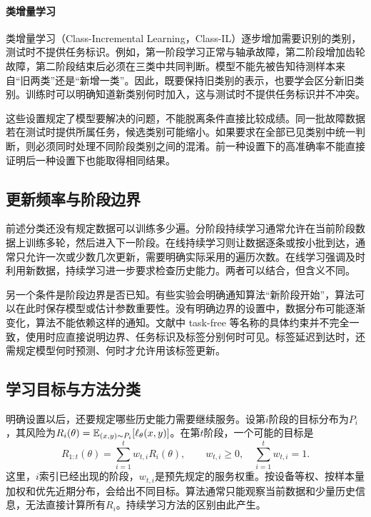 \paragraph{类增量学习}
类增量学习（Class-Incremental Learning，Class-IL）逐步增加需要识别的类别，测试时不提供任务标识。例如，第一阶段学习正常与轴承故障，第二阶段增加齿轮故障，第二阶段结束后必须在三类中共同判断。模型不能先被告知待测样本来自“旧两类”还是“新增一类”。因此，既要保持旧类别的表示，也要学会区分新旧类别。训练时可以明确知道新类别何时加入，这与测试时不提供任务标识并不冲突。

这些设置规定了模型要解决的问题，不能脱离条件直接比较成绩。同一批故障数据若在测试时提供所属任务，候选类别可能缩小。如果要求在全部已见类别中统一判断，则必须同时处理不同阶段类别之间的混淆。前一种设置下的高准确率不能直接证明后一种设置下也能取得相同结果。

\subsection{更新频率与阶段边界}
前述分类还没有规定数据可以训练多少遍。分阶段持续学习通常允许在当前阶段数据上训练多轮，然后进入下一阶段。在线持续学习则让数据逐条或按小批到达，通常只允许一次或少数几次更新，需要明确实际采用的遍历次数。在线学习强调及时利用新数据，持续学习进一步要求检查历史能力。两者可以结合，但含义不同。

另一个条件是阶段边界是否已知。有些实验会明确通知算法“新阶段开始”，算法可以在此时保存模型或估计参数重要性。没有明确边界的设置中，数据分布可能逐渐变化，算法不能依赖这样的通知。文献中 task-free 等名称的具体约束并不完全一致，使用时应直接说明边界、任务标识及标签分别何时可见。标签延迟到达时，还需规定模型何时预测、何时才允许用该标签更新。

\subsection{学习目标与方法分类}

明确设置以后，还要规定哪些历史能力需要继续服务。设第$i$阶段的目标分布为$P_i$，其风险为$R_i(\theta)=\mathbb{E}_{(x,y)\sim P_i}[\ell_\theta(x,y)]$。在第$t$阶段，一个可能的目标是
\begin{equation}
 R_{1:t}(\theta)=\sum_{i=1}^{t}w_{t,i}R_i(\theta),
 \qquad w_{t,i}\geq0,\quad \sum_{i=1}^{t}w_{t,i}=1.
\end{equation}
这里，$i$索引已经出现的阶段，$w_{t,i}$是预先规定的服务权重。按设备等权、按样本量加权和优先近期分布，会给出不同目标。算法通常只能观察当前数据和少量历史信息，无法直接计算所有$R_i$。持续学习方法的区别由此产生。

